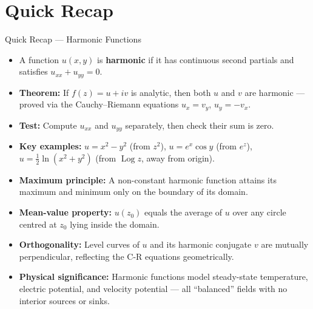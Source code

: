 \documentclass[12pt,a4paper]{article}
\begin{document}
\section{Quick Recap}

\begin{learnbox}{Quick Recap --- Harmonic Functions}
\begin{itemize}
  \item A function $u(x,y)$ is \textbf{harmonic} if it has continuous second partials and
  satisfies $u_{xx}+u_{yy}=0$.
  \item \textbf{Theorem:} If $f(z)=u+iv$ is analytic, then both $u$ and $v$ are harmonic ---
  proved via the Cauchy--Riemann equations $u_{x}=v_{y}$, $u_{y}=-v_{x}$.
  \item \textbf{Test:} Compute $u_{xx}$ and $u_{yy}$ separately, then check their sum is zero.
  \item \textbf{Key examples:} $u=x^{2}-y^{2}$ (from $z^{2}$), $u=e^{x}\cos y$ (from $e^{z}$),
  $u=\tfrac{1}{2}\ln(x^{2}+y^{2})$ (from $\operatorname{Log}z$, away from origin).
  \item \textbf{Maximum principle:} A non-constant harmonic function attains its maximum and
  minimum only on the boundary of its domain.
  \item \textbf{Mean-value property:} $u(z_{0})$ equals the average of $u$ over any circle
  centred at $z_{0}$ lying inside the domain.
  \item \textbf{Orthogonality:} Level curves of $u$ and its harmonic conjugate $v$ are
  mutually perpendicular, reflecting the C-R equations geometrically.
  \item \textbf{Physical significance:} Harmonic functions model steady-state temperature,
  electric potential, and velocity potential --- all ``balanced'' fields with no interior
  sources or sinks.
\end{itemize}
\end{learnbox}
\end{document}
